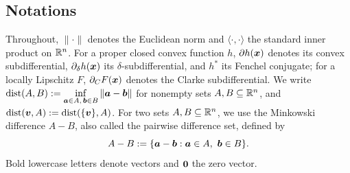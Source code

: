 \subsection{Notations}
Throughout, $\|\cdot\|$ denotes the Euclidean norm and
$\langle\cdot,\cdot\rangle$ the standard inner product on $\mathbb{R}^n$. For
a proper closed convex function $h$, $\partial h(\bm{x})$ denotes its
convex subdifferential, $\partial_\delta h(\bm{x})$ its
$\delta$-subdifferential, and $h^*$ its Fenchel conjugate; for a
locally Lipschitz $F$, $\partial_C F(\bm{x})$ denotes the Clarke
subdifferential. We write
$\operatorname{dist}(A,B) := \inf\limits_{\bm{a}\in A,\,\bm{b}\in B}\|\bm{a}-\bm{b}\|$
for nonempty sets $A,B\subseteq\mathbb{R}^n$, and $\operatorname{dist}(\bm{v},A)
:= \operatorname{dist}(\{\bm{v}\},A)$. For two sets \(A,B\subseteq\mathbb{R}^n\), we use the Minkowski difference
\(A-B\), also called the pairwise difference set, defined by
\[
    A-B:=\{\bm{a}-\bm{b}:\bm{a}\in A,\ \bm{b}\in B\}.
\]  Bold lowercase letters denote
vectors and $\bm{0}$ the zero vector. 

